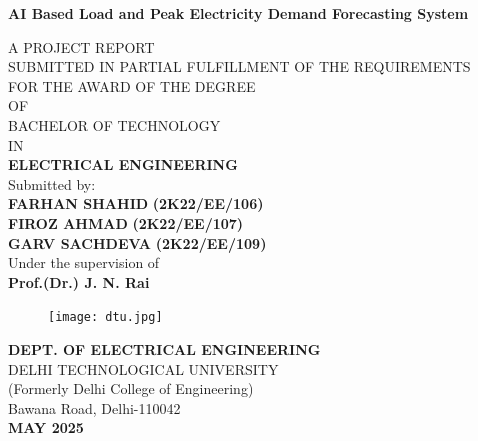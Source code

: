 \documentclass[12pt,a4paper]{report}
\begin{document}
\begin{center}
{\Large \textbf{AI Based Load and Peak Electricity Demand Forecasting System}}\\
\vspace{0.5cm}

A PROJECT REPORT\\
SUBMITTED IN PARTIAL FULFILLMENT OF THE REQUIREMENTS\\
FOR THE AWARD OF THE DEGREE\\
OF\\
BACHELOR OF TECHNOLOGY \\
IN\\
\textbf{ELECTRICAL ENGINEERING} \\
\vspace{1 cm}
Submitted by: \\

\textbf{FARHAN SHAHID}
\textbf{(2K22/EE/106)}\\

\textbf{FIROZ AHMAD}
\textbf{(2K22/EE/107)}\\

\textbf{GARV SACHDEVA}
\textbf{(2K22/EE/109)}\\
\vspace{0.2cm}
\vspace{1 cm}
Under the supervision of\\

\textbf{Prof.(Dr.) J. N. Rai}\\

\end{center}

\begin{center}
\begin{figure}[H]
    \centering
    \texttt{[image: dtu.jpg]}
    \label{fig:DTU logo}
\end{figure}
\textbf{DEPT. OF ELECTRICAL ENGINEERING}\\

DELHI TECHNOLOGICAL UNIVERSITY\\

(Formerly Delhi College of Engineering) \\
Bawana Road, Delhi-110042 \\
\textbf{MAY 2025}\\
\end{center}
\end{document}
